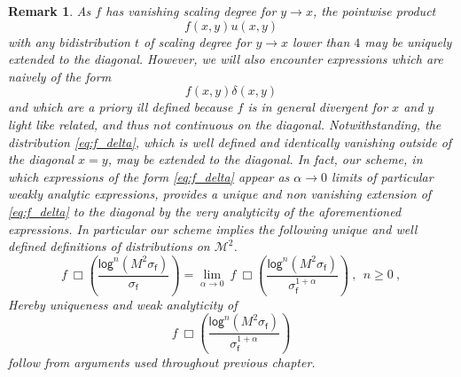 \documentclass[11pt]{book}
\renewcommand{\log}{\mathsf{log}}
\newcommand{\Mcal}{\mathcal{M}}
\newcommand{\fsf}{\mathsf{f}}
\theoremstyle{break}
\newtheorem{remark}{Remark}[chapter]
\begin{document}
\begin{remark}\label{rem:fdists}
As $f$ has vanishing scaling degree for $y \to x$, the pointwise product 
%
\begin{equation*}
f(x,y) u(x,y) 
\end{equation*}
%
with any bidistribution $t$ of scaling degree for $y\to x$ lower than $4$ may be uniquely extended to the diagonal. However, we will also encounter expressions which are naively of the form 
%
\begin{equation}
f(x,y) \delta(x,y) 
\label{eq:f_delta}
\end{equation}
%
and which are a priory ill defined because $f$ is in general divergent for $x$ and $y$ light like related, and thus not continuous on the diagonal. Notwithstanding, the distribution \eqref{eq:f_delta}, which is well defined and identically vanishing outside of the diagonal $x=y$, may be extended to the diagonal. In fact, our scheme, in which expressions of the form \eqref{eq:f_delta} appear as $\alpha \to 0$ limits of particular weakly analytic expressions, provides a unique and non vanishing extension of \eqref{eq:f_delta} to the diagonal by the very analyticity of the aforementioned expressions. In particular our scheme implies the following unique and well defined definitions of distributions on $\Mcal^2$.
%
\begin{equation}
f \ \Box \left( \frac{\log^n (M^2 \sigma_\fsf) }{\sigma_\fsf} \right) = \lim_{\alpha \to 0} \ f \ \Box \left(\frac{\log^n(M^2 \sigma_\fsf)}{\sigma^{1+\alpha}_\fsf} \right) \ , \ \ n \geq 0 \ ,
\label{eq:f_dists}
\end{equation}
%
Hereby uniqueness and weak analyticity of 
%
\begin{equation*}
f \ \Box\left( \frac{ \log^n(M^2 \sigma_\fsf) }{ \sigma^{1+\alpha}_\fsf } \right) 
\end{equation*}
%
follow from arguments used throughout previous chapter.
\end{remark}
\end{document}
